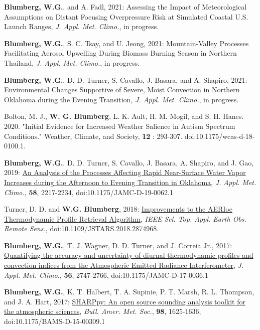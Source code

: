 
\begin{cvparagraph}
    \textbf{Blumberg, W.G.}, and A. Fadl, 2021: {Assessing the Impact of Meteorological Assumptions on Distant Focusing Overpressure Risk at Simulated Coastal U.S. Launch Ranges}, \emph{J. Appl. Met. Climo.}, in progress. %

    \textbf{Blumberg, W.G.}, S. C. Tsay, and U. Jeong, 2021:  {Mountain-Valley Processes Facilitating Aerosol Upwelling During Biomass Burning Season in Northern Thailand}, \emph{J. Appl. Met. Climo.}, in progress. %
    
    \textbf{Blumberg, W.G.}, D. D. Turner, S. Cavallo, J. Basara, and A. Shapiro, 2021:  {Environmental Changes Supportive of Severe, Moist Convection in Northern Oklahoma during the Evening Transition}, \emph{J. Appl. Met. Climo.}, in progress. %

    Bolton, M. J., \textbf{W. G. Blumberg}, L. K. Ault, H. M. Mogil, and S. H. Hanes. 2020. "Initial Evidence for Increased Weather Salience in Autism Spectrum Conditions." Weather, Climate, and Society, \textbf{12} : 293-307. doi:10.1175/wcas-d-18-0100.1.

    \textbf{Blumberg, W.G.}, D. D. Turner, S. Cavallo, J. Basara, A. Shapiro, and J. Gao, 2019:  \href{https://journals.ametsoc.org/doi/abs/10.1175/JAMC-D-19-0062.1?mobileUi=0}{An Analysis of the Processes Affecting Rapid Near-Surface Water Vapor Increases during the Afternoon to Evening Transition in Oklahoma}, \emph{J. Appl. Met. Climo.}, \textbf{58}, 2217-2234, doi:10.1175/JAMC-D-19-0062.1 %

    Turner, D. D. and \textbf{W.G. Blumberg}, 2018: \href{https://ieeexplore.ieee.org/abstract/document/8576572}{Improvements to the AERIoe Thermodynamic Profile Retrieval Algorithm}, \emph{IEEE Sel. Top. Appl. Earth Obs. Remote Sens.}, doi:10.1109/JSTARS.2018.2874968.
    
    \textbf{Blumberg, W.G.}, T. J. Wagner, D. D. Turner, and J. Correia Jr., 2017: \href{http://journals.ametsoc.org/doi/abs/10.1175/JAMC-D-17-0036.1}{Quantifying the accuracy and uncertainty of diurnal thermodynamic profiles and convection indices from the Atmospheric Emitted Radiance Interferometer}, \emph{J. Appl. Met. Climo.}, \textbf{56}, 2747-2766, doi:10.1175/JAMC-D-17-0036.1
    
    \textbf{Blumberg, W.G.}, K. T. Halbert, T. A. Supinie, P. T. Marsh, R. L. Thompson, and J. A. Hart, 2017: \href{http://journals.ametsoc.org/doi/abs/10.1175/BAMS-D-15-00309.1}{SHARPpy: An open source sounding analysis toolkit for the atmospheric sciences}, \emph{Bull. Amer. Met. Soc.}, \textbf{98}, 1625-1636, doi:10.1175/BAMS-D-15-00309.1
    

\end{cvparagraph}
